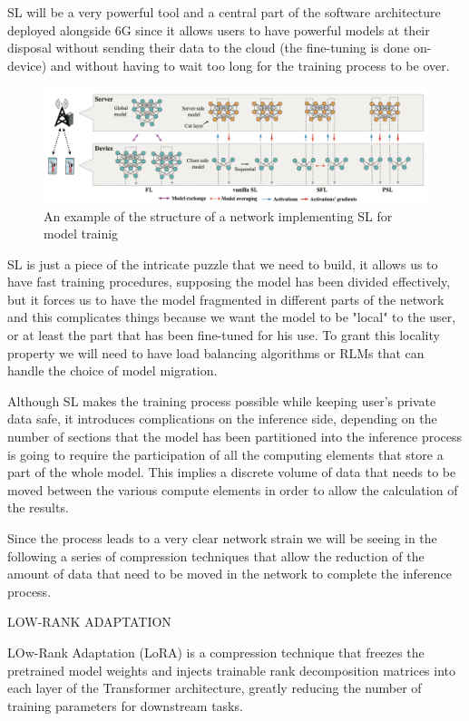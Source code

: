 SL will be a very powerful tool and a central part of the software architecture deployed alongside
6G since it allows users to have powerful models at their disposal without sending their data to the
cloud (the fine-tuning is done on-device) and without having to wait too long for the training
process to be over.
\begin{figure}
	\center
	\label{img:split-learning}
	\includegraphics[scale=0.65]{figures/split-learning.png}
	\caption{An example of the structure of a network implementing SL for model trainig
		\cite{split-learning}}
\end{figure}
SL is just a piece of the intricate puzzle that we need to build, it allows us to have fast training
procedures, supposing the model has been divided effectively, but it forces us to have the model
fragmented in different parts of the network and this complicates things because we want the model
to be "local" to the user, or at least the part that has been fine-tuned for his use.
To grant this locality property we will need to have load balancing algorithms or RLMs that can
handle the choice of model migration.

Although SL makes the training process possible while keeping user's private data safe, it
introduces complications on the inference side, depending on the number of sections that the model
has been partitioned into the inference process is going to require the participation of all the
computing elements that store a part of the whole model. This implies a discrete volume of data that
needs to be moved between the various compute elements in order to allow the calculation of the
results.

Since the process leads to a very clear network strain we will be seeing in the following a series
of compression techniques that allow the reduction of the amount of data that need to be moved in
the network to complete the inference process.

\bigskip
\noindent
LOW-RANK ADAPTATION

LOw-Rank Adaptation (LoRA) is a compression technique that freezes the pretrained model weights and injects
trainable rank decomposition matrices into each layer of the Transformer architecture, greatly
reducing the number of training parameters for downstream tasks.

